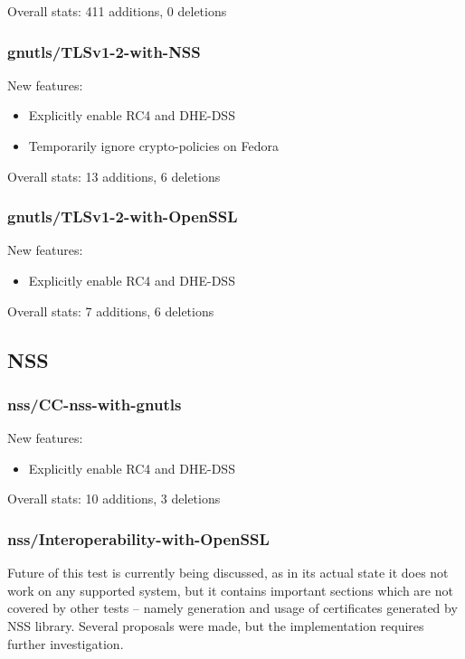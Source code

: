     \noindent Overall stats: 411 additions, 0 deletions

\subsubsection{gnutls/TLSv1-2-with-NSS}
    New features:
    \begin{itemize}
        \item Explicitly enable RC4 and DHE-DSS
        \item Temporarily ignore crypto-policies on Fedora
    \end{itemize}

    \noindent Overall stats: 13 additions, 6 deletions

\subsubsection{gnutls/TLSv1-2-with-OpenSSL}
    New features:
    \begin{itemize}
        \item Explicitly enable RC4 and DHE-DSS
    \end{itemize}

    \noindent Overall stats: 7 additions, 6 deletions

\subsection{NSS}
\subsubsection{nss/CC-nss-with-gnutls}
    New features:
    \begin{itemize}
        \item Explicitly enable RC4 and DHE-DSS
    \end{itemize}

    \noindent Overall stats: 10 additions, 3 deletions

\subsubsection{nss/Interoperability-with-OpenSSL}
    Future of this test is currently being discussed, as in its actual state it does
    not work on any supported system, but it contains important sections which are not
    covered by other tests -- namely generation and usage of certificates
    generated by NSS library. Several proposals were made, but the implementation
    requires further investigation.


